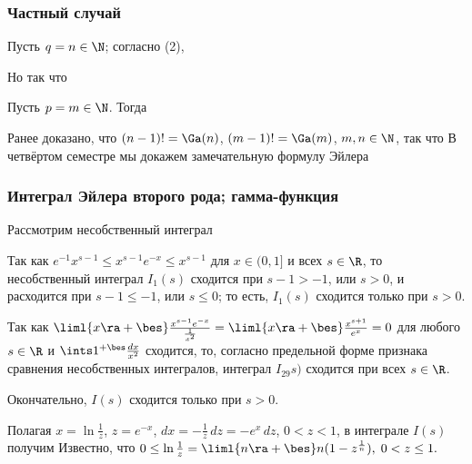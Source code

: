 \documentclass[a4paper]{article}
\begin{document}
\subsubsection{Частный случай}

Пусть $q=n\in\N$; согласно (2), 

Но  так что 

Пусть $p=m\in\N$. Тогда 

Ранее доказано, что $(n-1)!=\Ga(n)$, $(m-1)!=\Ga(m)$, $m,n\in\N$,
так что  В
четвёртом семестре мы докажем замечательную формулу Эйлера

\subsubsection{Интеграл Эйлера второго рода; гамма-функция}

Рассмотрим несобственный интеграл 

Так как $e^{-1} x^{s-1} \le x^{s-1} e^{-x} \le x^{s-1}$ для
$x\in(0,1]$ и всех $s\in\R$, то несобственный интеграл $I_1(s)$
сходится при $s-1>-1$, или $s>0$, и расходится при $s-1\le-1$, или
$s\le0$; то есть, $I_1(s)$ сходится только при $s>0$.

Так как $\liml{x\ra+\bes} \frac{x^{s-1}e^{-x}}{\frac1{x^2}} =
\liml{x\ra+\bes} \frac{x^{s+1}}{e^x}=0$ для любого $s\in\R$ и
$\ints1^{+\bes} \frac{dx}{x^2}$ сходится, то, согласно предельной
форме признака сравнения несобственных интегралов, интеграл $I_29s)$
сходится при всех $s\in\R$.

Окончательно, $I(s)$ сходится только при $s>0$.

Полагая $x=\ln\frac1z$, $z=e^{-x}$, $dx=-\frac1z\,dz = -e^x\,dz$,
$0<z<1$, в интеграле $I(s)$ получим  Известно, что $0\le \ln\frac1z =
\liml{n\ra+\bes} n(1-z^{\frac1n}), \; 0<z\le1.$
\end{document}
